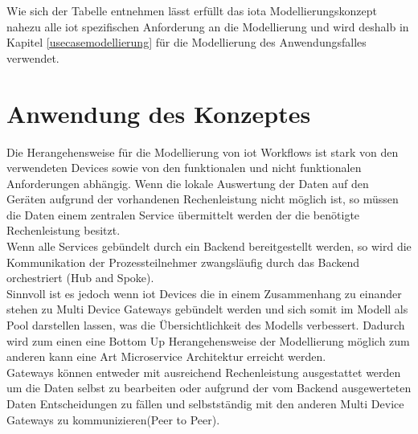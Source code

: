 \documentclass[a4paper, 12pt, twoside, headsepline=true]{scrartcl} %
\begin{document}
Wie sich der Tabelle entnehmen lässt erfüllt das \ac{iota} Modellierungskonzept nahezu alle \ac{iot} spezifischen Anforderung an die Modellierung und wird deshalb in Kapitel \ref{usecasemodellierung} für die Modellierung des Anwendungsfalles verwendet.


\newpage

\section{Anwendung des Konzeptes} \label{anwendung}
Die Herangehensweise für die Modellierung von \ac{iot} Workflows ist stark von den verwendeten Devices sowie von den funktionalen und nicht funktionalen Anforderungen abhängig. Wenn die lokale Auswertung der Daten auf den Geräten aufgrund der vorhandenen Rechenleistung nicht möglich ist, so müssen die Daten einem zentralen Service übermittelt werden der die benötigte Rechenleistung besitzt.\\
Wenn alle Services gebündelt durch ein Backend bereitgestellt werden, so wird die Kommunikation der Prozessteilnehmer zwangsläufig durch das Backend orchestriert (Hub and Spoke).\\
Sinnvoll ist es jedoch wenn \ac{iot} Devices die in einem Zusammenhang zu einander stehen zu Multi Device Gateways  gebündelt werden und sich somit im Modell als Pool darstellen lassen, was die Übersichtlichkeit des Modells verbessert. Dadurch wird zum einen eine Bottom Up Herangehensweise der Modellierung möglich zum anderen kann eine Art Microservice Architektur erreicht werden.\\
Gateways können entweder mit ausreichend Rechenleistung ausgestattet werden um die Daten selbst zu bearbeiten oder aufgrund der vom Backend ausgewerteten Daten Entscheidungen zu fällen und selbstständig mit den anderen Multi Device Gateways zu kommunizieren(Peer to Peer).\\
\end{document}
